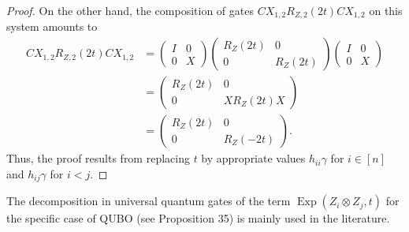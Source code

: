\begin{proof}
On the other hand, the composition of gates $C X_{1,2} R_{Z, 2}(2 t) C X_{1,2}$ on this system amounts to
$$
\begin{aligned}
C X_{1,2} R_{Z, 2}(2 t) C X_{1,2} & =\left(\begin{array}{cc}
I & 0 \\
0 & X
\end{array}\right)\left(\begin{array}{cc}
R_{Z}(2 t) & 0 \\
0 & R_{Z}(2 t)
\end{array}\right)\left(\begin{array}{ll}
I & 0 \\
0 & X
\end{array}\right) \\
& =\left(\begin{array}{cc}
R_{Z}(2 t) & 0 \\
0 & X R_{Z}(2 t) X
\end{array}\right) \\
& =\left(\begin{array}{cc}
R_{Z}(2 t) & 0 \\
0 & R_{Z}(-2 t)
\end{array}\right) .
\end{aligned}
$$
Thus, the proof results from replacing $t$ by appropriate values $h_{i i} \gamma$ for $i \in[n]$ and $h_{i j} \gamma$ for $i<j$.
\end{proof}

The decomposition in universal quantum gates of the term $\operatorname{Exp}\left(Z_{i} \otimes Z_{j}, t\right)$ for the specific case of QUBO (see Proposition 35) is mainly used in the literature. 
